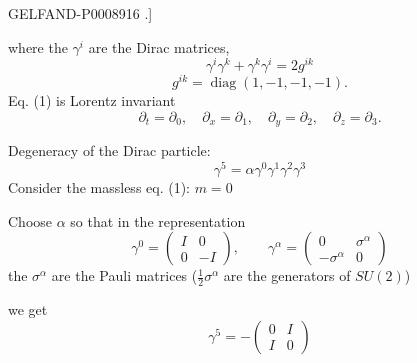 \begin{GelfandAdjacentEvidence}{GELFAND-P000891}{6}
.]

where the $\gamma^i$ are the Dirac matrices,
\begin{equation*}
\gamma^i\gamma^k+\gamma^k\gamma^i=2g^{ik} \tag{3}
\end{equation*}
\begin{equation*}
g^{ik}=\operatorname{diag}(1,-1,-1,-1). \tag{4}
\end{equation*}
Eq. (1) is Lorentz invariant
\[
\partial_t=\partial_0,\quad \partial_x=\partial_1,\quad
\partial_y=\partial_2,\quad \partial_z=\partial_3.
\]

Degeneracy of the Dirac particle:
\begin{equation*}
\gamma^5=\alpha\gamma^0\gamma^1\gamma^2\gamma^3 \tag{5}
\end{equation*}
Consider the massless eq. (1): $m=0$

Choose $\alpha$ so that in the representation
\begin{equation*}
\gamma^0=\begin{pmatrix}I&0\\0&-I\end{pmatrix},\qquad
\gamma^\alpha=\begin{pmatrix}0&\sigma^\alpha\\-\sigma^\alpha&0\end{pmatrix} \tag{6}
\end{equation*}
the $\sigma^\alpha$ are the Pauli matrices ($\frac12\sigma^\alpha$ are the generators of $SU(2)$)

we get
\begin{equation*}
\gamma^5=-\begin{pmatrix}0&I\\I&0\end{pmatrix} \tag{7}
\end{equation*}

\end{GelfandAdjacentEvidence}



